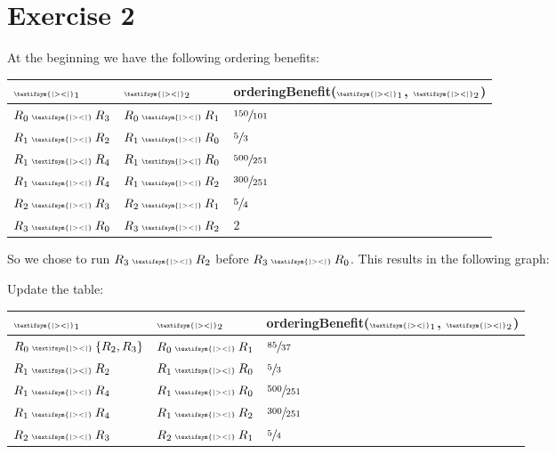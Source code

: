 \documentclass{scrartcl}
\newcommand{\join}{\mathbin{\text{\begin{tiny}\textifsym{|><|}\end{tiny}}}}
\begin{document}
\section*{Exercise 2}

At the beginning we have the following ordering benefits:

\begin{table}[h]
\begin{tabular}{lll}
$\join_1$ & $\join_2$ & orderingBenefit($\join_1$, $\join_2$) \\ \hline
$R_0 \join R_3$ & $R_0 \join R_1$ & $\sfrac{150}{101}$ \\
$R_1 \join R_2$ & $R_1 \join R_0$ & $\sfrac{5}{3}$ \\
$R_1 \join R_4$ & $R_1 \join R_0$ & $\sfrac{500}{251}$ \\
$R_1 \join R_4$ & $R_1 \join R_2$ & $\sfrac{300}{251}$ \\
$R_2 \join R_3$ & $R_2 \join R_1$ & $\sfrac{5}{4}$ \\
$R_3 \join R_0$ & $R_3 \join R_2$ & $2$
\end{tabular}
\end{table}

So we chose to run $R_3 \join R_2$ before $R_3 \join R_0$. This results in the
following graph:


\pagebreak

Update the table:

\begin{table}[h]
\begin{tabular}{lll}
$\join_1$ & $\join_2$ & orderingBenefit($\join_1$, $\join_2$) \\ \hline
$R_0 \join \{R_2, R_3\}$ & $R_0 \join R_1$ & $\sfrac{85}{37}$ \\
$R_1 \join R_2$ & $R_1 \join R_0$ & $\sfrac{5}{3}$ \\
$R_1 \join R_4$ & $R_1 \join R_0$ & $\sfrac{500}{251}$ \\
$R_1 \join R_4$ & $R_1 \join R_2$ & $\sfrac{300}{251}$ \\
$R_2 \join R_3$ & $R_2 \join R_1$ & $\sfrac{5}{4}$
\end{tabular}
\end{table}
\end{document}
